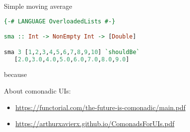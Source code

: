 \documentclass[10pt]{beamer}
\begin{document}
\begin{frame}[fragile]
  Simple moving average
\begin{lstlisting}[language=haskell, basicstyle=\ttfamily]
{-# LANGUAGE OverloadedLists #-}

sma :: Int -> NonEmpty Int -> [Double]

sma 3 [1,2,3,4,5,6,7,8,9,10] `shouldBe`
   [2.0,3.0,4.0,5.0,6.0,7.0,8.0,9.0]
  \end{lstlisting}
because 
\end{frame}
\begin{frame}[fragile]
  About comonadic UIs:
  \begin{itemize}
    \item \url{https://functorial.com/the-future-is-comonadic/main.pdf}
    \item \url{https://arthurxavierx.github.io/ComonadsForUIs.pdf}
  \end{itemize}
\end{frame}
\end{document}
